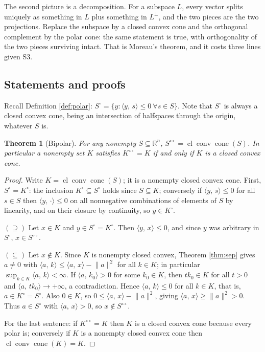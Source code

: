 \documentclass[11pt,a4paper]{article}
\theoremstyle{definition}
\theoremstyle{plain}
\newtheorem{theorem}{Theorem}
\theoremstyle{remark}
\newcommand{\R}{\mathbb{R}}
\newcommand{\ip}[2]{\langle #1,\, #2\rangle}
\newcommand{\norm}[1]{\lVert #1\rVert}
\DeclareMathOperator{\conv}{conv}
\DeclareMathOperator{\cone}{cone}
\DeclareMathOperator{\cl}{cl}
\begin{document}
The second picture is a decomposition. For a subspace $L$, every vector splits uniquely as
something in $L$ plus something in $L^\perp$, and the two pieces are the two projections. Replace
the subspace by a closed convex cone and the orthogonal complement by the polar cone: the same
statement is true, with orthogonality of the two pieces surviving intact. That is Moreau's
theorem, and it costs three lines given S3.

\subsection*{Statements and proofs}

Recall Definition \ref{def:polar}: $S^\circ=\{y:\ip{y}{s}\le0\ \forall s\in S\}$. Note that
$S^\circ$ is always a closed convex cone, being an intersection of halfspaces through the
origin, whatever $S$ is.

\begin{theorem}[Bipolar]
\label{thm:bipolar}
For any nonempty $S\subseteq\R^n$, $S^{\circ\circ}=\cl\conv\cone(S)$. In particular a nonempty
set $K$ satisfies $K^{\circ\circ}=K$ if and only if $K$ is a closed convex cone.
\end{theorem}

\begin{proof}
Write $K=\cl\conv\cone(S)$; it is a nonempty closed convex cone. First, $S^\circ=K^\circ$:
the inclusion $K^\circ\subseteq S^\circ$ holds since $S\subseteq K$; conversely if
$\ip{y}{s}\le0$ for all $s\in S$ then $\ip{y}{\cdot}\le0$ on all nonnegative combinations of
elements of $S$ by linearity, and on their closure by continuity, so $y\in K^\circ$.

$(\supseteq)$ Let $x\in K$ and $y\in S^\circ=K^\circ$. Then $\ip{y}{x}\le0$, and since $y$ was
arbitrary in $S^\circ$, $x\in S^{\circ\circ}$.

$(\subseteq)$ Let $x\notin K$. Since $K$ is nonempty closed convex, Theorem \ref{thm:sep} gives
$a\ne0$ with $\ip{a}{k}\le\ip{a}{x}-\norm a^2$ for all $k\in K$; in particular
$\sup_{k\in K}\ip{a}{k}<\infty$. If $\ip{a}{k_0}>0$ for some $k_0\in K$, then $tk_0\in K$ for
all $t>0$ and $\ip{a}{tk_0}\to+\infty$, a contradiction. Hence $\ip{a}{k}\le0$ for all $k\in K$,
that is, $a\in K^\circ=S^\circ$. Also $0\in K$, so $0\le\ip{a}{x}-\norm a^2$, giving
$\ip{a}{x}\ge\norm a^2>0$. Thus $a\in S^\circ$ with $\ip{a}{x}>0$, so $x\notin S^{\circ\circ}$.

For the last sentence: if $K^{\circ\circ}=K$ then $K$ is a closed convex cone because every
polar is; conversely if $K$ is a nonempty closed convex cone then $\cl\conv\cone(K)=K$.
\end{proof}
\end{document}
